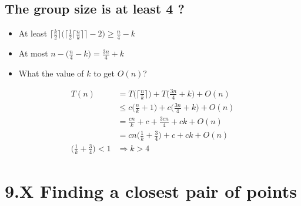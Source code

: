 \documentclass[a4paper]{article}
\begin{document}
\subsection*{The group size is at least 4 ?}
    \begin{itemize}
        \item At least $\Big\lceil{\frac{k}{2}}\Big\rceil\bigg(\Big\lceil{\frac{1}{2}\big\lceil{\frac{n}{k}}\big\rceil}\Big\rceil-2\bigg)\geq \frac{n}{4}-k$
        \item At most $n-\big(\frac{n}{4}-k\big)=\frac{3n}{4}+k$
        \item What the value of $k$ to get $O(n)$?
    \end{itemize}
    \begin{align*}
        T(n)&= T\Big(\Big\lceil{\frac{n}{k}}\Big\rceil\Big)+T\Big(\frac{3n}{4}+k\Big)+O(n)\\
        &\leq c\Big(\frac{n}{k}+1\Big)+c\Big(\frac{3n}{4}+k\Big)+O(n)\\
        &=\frac{cn}{k}+c+\frac{3cn}{4}+ck+O(n)\\
        &=cn\Big(\frac{1}{k}+\frac{3}{4}\Big)+c+ck+O(n)\\
        \Big(\frac{1}{k}+\frac{3}{4}\Big)<1 & \Rightarrow k>4
    \end{align*}
\section*{9.X Finding a closest pair of points}
\end{document}
